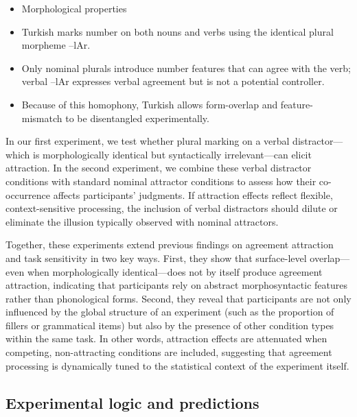 \documentclass[
  authoryear,
  preprint]{elsarticle}
\providecommand{\tightlist}{%
  \setlength{\itemsep}{0pt}\setlength{\parskip}{0pt}}
\begin{document}
\begin{itemize}
\tightlist
\item
  Morphological properties
\item
  Turkish marks number on both nouns and verbs using the identical
  plural morpheme --lAr.
\item
  Only nominal plurals introduce number features that can agree with the
  verb; verbal --lAr expresses verbal agreement but is not a potential
  controller.
\item
  Because of this homophony, Turkish allows form-overlap and
  feature-mismatch to be disentangled experimentally.
\end{itemize}

In our first experiment, we test whether plural marking on a verbal
distractor---which is morphologically identical but syntactically
irrelevant---can elicit attraction. In the second experiment, we combine
these verbal distractor conditions with standard nominal attractor
conditions to assess how their co-occurrence affects participants'
judgments. If attraction effects reflect flexible, context-sensitive
processing, the inclusion of verbal distractors should dilute or
eliminate the illusion typically observed with nominal attractors.

Together, these experiments extend previous findings on agreement
attraction and task sensitivity in two key ways. First, they show that
surface-level overlap---even when morphologically identical---does not
by itself produce agreement attraction, indicating that participants
rely on abstract morphosyntactic features rather than phonological
forms. Second, they reveal that participants are not only influenced by
the global structure of an experiment (such as the proportion of fillers
or grammatical items) but also by the presence of other condition types
within the same task. In other words, attraction effects are attenuated
when competing, non-attracting conditions are included, suggesting that
agreement processing is dynamically tuned to the statistical context of
the experiment itself.

\subsection{Experimental logic and
predictions}\label{experimental-logic-and-predictions}
\end{document}
